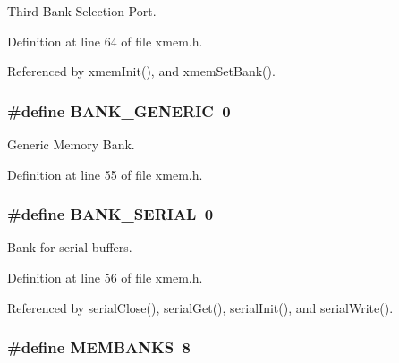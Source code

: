 Third Bank Selection Port. 



Definition at line 64 of file xmem.\-h.



Referenced by xmem\-Init(), and xmem\-Set\-Bank().

\hypertarget{group__xmem_ga6b1167d0078b33af8ec17ededaebe0cb}{
\subsubsection[{B\-A\-N\-K\-\_\-\-G\-E\-N\-E\-R\-I\-C}]{\setlength{\rightskip}{0pt plus 5cm}\#define B\-A\-N\-K\-\_\-\-G\-E\-N\-E\-R\-I\-C~0}}\label{group__xmem_ga6b1167d0078b33af8ec17ededaebe0cb}


Generic Memory Bank. 



Definition at line 55 of file xmem.\-h.

\hypertarget{group__xmem_gaa5177871b2303418ed492a18405273f9}{
\subsubsection[{B\-A\-N\-K\-\_\-\-S\-E\-R\-I\-A\-L}]{\setlength{\rightskip}{0pt plus 5cm}\#define B\-A\-N\-K\-\_\-\-S\-E\-R\-I\-A\-L~0}}\label{group__xmem_gaa5177871b2303418ed492a18405273f9}


Bank for serial buffers. 



Definition at line 56 of file xmem.\-h.



Referenced by serial\-Close(), serial\-Get(), serial\-Init(), and serial\-Write().

\hypertarget{group__xmem_ga1ed280cb3dd0a4a03aeda6aaccc180d3}{
\subsubsection[{M\-E\-M\-B\-A\-N\-K\-S}]{\setlength{\rightskip}{0pt plus 5cm}\#define M\-E\-M\-B\-A\-N\-K\-S~8}}\label{group__xmem_ga1ed280cb3dd0a4a03aeda6aaccc180d3}


